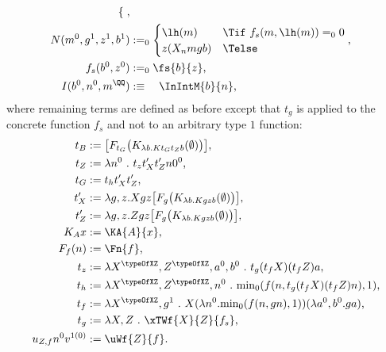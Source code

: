 \begin{cor}
\begin{align*}
\begin{cases}
  \end{cases}  \text{,} \\
N(m^0,g^1,z^1,b^1)&:=_0\begin{cases}
\lh(m) &\Tif\ f_s(m,\lh(m))=_00\\
z(X_nmgb) &\Telse
\end{cases}  \text{,} \\
        f_s(b^0,z^0)
                 &:=_0\fs{b}{z}  \text{,} \\
        I(b^0,n^0,m^\QQ)
                 &:\equiv\ \ \  \InIntM{b}{n}
\text{,}
\end{align*}
where remaining terms are defined as before except that $t_g$ is applied to the
concrete function $f_s$ and not to an arbitrary type $1$ function:
\begin{align*}
        t_B    &:= \big[F_{t_G}\big(K_{\lambda b.Kt_Gt_Zb}(\emptyset)\big)\big] \text{,} \\
        t_Z    &:= \lambda n^0\ .\ t_zt_{X}'t_{Z}'n0^0 \text{,} \\
        t_G    &:= t_ht_{X}'t_{Z}' \text{,} \\
        t_{X}' &:=\lambda g,z.Xgz
                 \big[F_{g}\big(K_{\lambda b.Kgzb}(\emptyset)\big)\big]  \text{,} \\
        t_{Z}' &:=\lambda g,z.Zgz
                 \big[F_{g}\big(K_{\lambda b.Kgzb}(\emptyset)\big)\big]  \text{,} \\
        K_Ax     &:= \KA{A}{x}         \text{,} \\
        F_f(n) &:= \Fn{f}  \text{,} \\
        t_z      &:=\lambda X^{\typeOfXZ},Z^{\typeOfXZ},a^0,b^0\ .\ t_g(t_fX)(t_fZ)a \text{,} \\
        t_h      &:=\lambda X^{\typeOfXZ},Z^{\typeOfXZ},n^0\ .\ 
                        {\min}_0(f(n,t_g(t_fX)(t_fZ)n),1)  \text{,} \\
        t_f      &:=\lambda X^{\typeOfXZ},g^1\ .\ 
                       X(\lambda n^0 . {\min}_0(f(n,gn),1) )(\lambda a^0,b^0 . ga)  \text{,} \\
        t_g      &:=\lambda X,Z\ .\ \xTWf{X}{Z}{f_s} \text{,} \\
        u_{Z,f}n^0v^{1(0)}  
                 &:= \uWf{Z}{f} \text{.} \\
\end{align*}
\end{cor}
